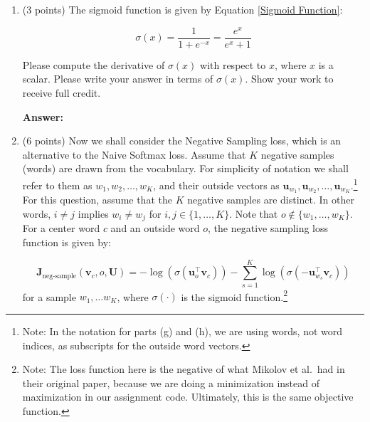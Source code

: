 \documentclass{article}
\newenvironment{answer}{
    {\bf Answer:} \sf \begingroup\color{red}
}{\endgroup}%
\begin{document}
\begin{enumerate}[label=(\alph*)]
Where $x$ is a scalar and $0<\alpha <1$, please compute the derivative of $f(x)$ with respect to $x$. You may ignore the case where the derivative is not defined at 0.\footnote{If you're interested in how to handle the derivative at this point, you can read more about the notion of \hyperref[https://en.wikipedia.org/wiki/Subderivative]{subderivatives}.}

\begin{shaded}
\begin{answer}

\end{answer}
\end{shaded}

\item (3 points) The sigmoid function is given by Equation \ref{Sigmoid Function}:

\begin{equation}
    \label{Sigmoid Function}
    \sigma (x) = \frac{1}{1 + e^{-x}} = \frac{e^{x}}{e^{x} + 1}
\end{equation}

Please compute the derivative of $\sigma(x)$ with respect to $x$, where $x$ is a scalar. Please write your answer in terms of $\sigma(x)$. Show your work to receive full credit.

\begin{shaded}
\begin{answer}

\end{answer}
\end{shaded}

\item (6 points) Now we shall consider the Negative Sampling loss, which is an alternative to the Naive Softmax loss.  Assume that $K$ negative samples (words) are drawn from the vocabulary. For simplicity of notation we shall refer to them as $w_1, w_2, \dots, w_K$, and their outside vectors as $\bm u_{w_1}, \bm u_{w_2}, \dots, \bm u_{w_K}$.\footnote{Note: In the notation for parts (g) and (h), we are using words, not word indices, as subscripts for the outside word vectors.} For this question, assume that the $K$ negative samples are distinct. In other words, $i\neq j$ implies $w_i\neq w_j$ for $i,j\in\{1,\dots,K\}$.
Note that $o\notin\{w_1, \dots, w_K\}$. 
For a center word $c$ and an outside word $o$, the negative sampling loss function is given by:

\begin{equation}
\bm J_{\text{neg-sample}}(\bm v_c, o, \bm U) = -\log(\sigma(\bm u_o^\top \bm v_c)) - \sum_{s=1}^K \log(\sigma(-\bm u_{w_s}^\top \bm v_c))
\end{equation}
for a sample $w_1, \ldots w_K$, where $\sigma(\cdot)$ is the sigmoid function.\footnote{Note: The loss function here is the negative of what Mikolov et al.\ had in their original paper, because we are doing a minimization instead of maximization in our assignment code. Ultimately, this is the same objective function.}


\end{enumerate}
\end{document}
